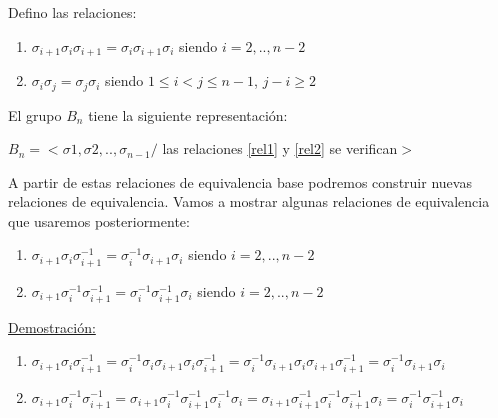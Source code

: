 	\begin{teo}	    \label{teoBn}
	    Defino las relaciones:
	    \begin{enumerate}
	    	\item $ \sigma_{i+1}\sigma_{i}\sigma_{i+1} =\sigma_{i}\sigma_{i+1}\sigma_{i} $ siendo $i=2,..,n-2 $ \label{rel1}
	    	\item $ \sigma_{i}\sigma_{j}=\sigma_{j}\sigma_{i} $ siendo $1 \le i < j \le n-1 $, $j-i \geq 2$	 \label{rel2}   	
	    \end{enumerate}
	    El grupo $B_{n}$ tiene la siguiente representación:
        \begin{center}
			$B_{n} = <\sigma1, \sigma2,..,\sigma_{n-1} /$ las relaciones \ref{rel1} y \ref{rel2} se verifican$>$
        \end{center}
	   
	\end{teo}
	
	A partir de estas relaciones de equivalencia base podremos construir nuevas relaciones de equivalencia. Vamos a mostrar algunas relaciones de equivalencia que usaremos posteriormente:
	\begin{enumerate}
		\item $ \sigma_{i+1}\sigma_{i}\sigma_{i+1}^{-1} =\sigma_{i}^{-1}\sigma_{i+1}\sigma_{i} $ siendo $i=2,..,n-2 $		
		\item $ \sigma_{i+1}\sigma_{i}^{-1}\sigma_{i+1}^{-1} =\sigma_{i}^{-1}\sigma_{i+1}^{-1}\sigma_{i} $ siendo $i=2,..,n-2 $
	\end{enumerate}
	
    \underline{	Demostración:}
    \begin{enumerate}
    	\item $ \sigma_{i+1}\sigma_{i}\sigma_{i+1}^{-1} = \sigma_{i}^{-1}\sigma_{i}\sigma_{i+1}\sigma_{i}\sigma_{i+1}^{-1} = \sigma_{i}^{-1}\sigma_{i+1}\sigma_{i}\sigma_{i+1}\sigma_{i+1}^{-1} =  \sigma_{i}^{-1}\sigma_{i+1}\sigma_{i} $ 		
    	\item $ \sigma_{i+1}\sigma_{i}^{-1}\sigma_{i+1}^{-1} = \sigma_{i+1}\sigma_{i}^{-1}\sigma_{i+1}^{-1}\sigma_{i}^{-1}\sigma_{i}=\sigma_{i+1}\sigma_{i+1}^{-1}\sigma_{i}^{-1}\sigma_{i+1}^{-1}\sigma_{i} = \sigma_{i}^{-1}\sigma_{i+1}^{-1}\sigma_{i}$
    \end{enumerate}
	

